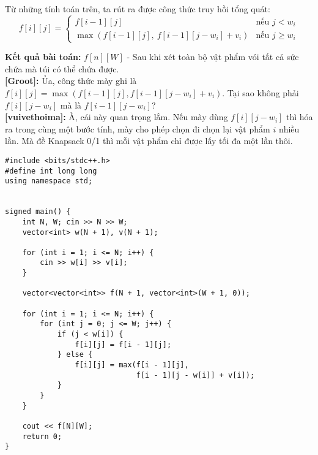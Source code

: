 Từ những tính toán trên, ta rút ra được công thức truy hồi tổng quát:
\[
f[i][j] =
\begin{cases}
    f[i - 1][j] & \text{nếu } j < w_i \\
    \max(f[i - 1][j],\ f[i - 1][j - w_i] + v_i) & \text{nếu } j \geq w_i
\end{cases}
\]

\textbf{Kết quả bài toán:} $f[n][W]$ - Sau khi xét toàn bộ vật phẩm vói tất cả sức chứa mà túi có thể chứa được.\\

\textbf{[Groot]:} Ủa, công thức mày ghi là $f[i][j] = \max(f[i-1][j], f[i-1][j-w_i] + v_i)$. Tại sao không phải $f[i][j-w_i]$ mà là $f[i-1][j-w_i]$?\\

\textbf{[vuivethoima]:} À, cái này quan trọng lắm.  
Nếu mày dùng $f[i][j-w_i]$ thì hóa ra trong cùng một bước tính, mày cho phép chọn đi chọn lại vật phẩm $i$ nhiều lần.  
Mà đề Knapsack 0/1 thì mỗi vật phẩm chỉ được lấy tối đa một lần thôi.

\begin{lstlisting}[title=\centering \textbf{Cài đặt}]
#include <bits/stdc++.h>
#define int long long
using namespace std;


signed main() {
    int N, W; cin >> N >> W;
    vector<int> w(N + 1), v(N + 1);

    for (int i = 1; i <= N; i++) {
        cin >> w[i] >> v[i];
    }

    vector<vector<int>> f(N + 1, vector<int>(W + 1, 0));

    for (int i = 1; i <= N; i++) {
        for (int j = 0; j <= W; j++) {
            if (j < w[i]) {
                f[i][j] = f[i - 1][j];
            } else {
                f[i][j] = max(f[i - 1][j],
                              f[i - 1][j - w[i]] + v[i]);
            }
        }
    }

    cout << f[N][W];
    return 0;
}

\end{lstlisting}